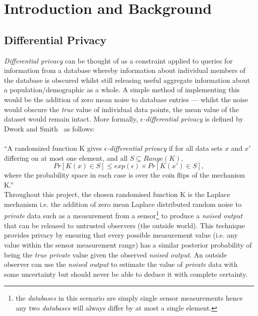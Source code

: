 \documentclass[12pt]{article}
\begin{document}
\newpage


\pagestyle{default}
%
%

\section{Introduction and Background}
  \subsection{Differential Privacy}
    \textit{Differential privacy} can be thought of as a constraint applied to queries for information from a database whereby information about individual members of the database is obscured whilst still releasing useful aggregate information about a population/demographic as a whole. A simple method of implementing this would be the addition of zero mean noise to database entries --- whilst the noise would obscure the \textit{true} value of individual data points, the mean value of the dataset would remain intact. More formally, \textit{$\epsilon$-differential privacy} is defined by Dwork and Smith~\cite{dwork2010differential} as follows:\\
    \\
    ``A randomized function K gives \textit{$\epsilon$-differential privacy} if for all data sets $x$ and $x'$ differing on at most one element, and all $S \subseteq Range(K)$,
    \begin{equation}
      Pr[K(x) \in S] \leq exp(\epsilon) \times Pr[K(x') \in S],
    \end{equation}
    where the probability space in each case is over the coin flips of the mechanism K.''\\

    Throughout this project, the chosen randomised function K is the Laplace mechanism i.e. the addition of zero mean Laplace distributed random noise to \textit{private} data such as a measurement from a sensor\footnote{the \textit{databases} in this scenario are simply single sensor measurements hence any two \textit{databases} will always differ by at most a single element.} to produce a \textit{noised output} that can be released to untrusted observers (the outside world). This technique provides privacy by ensuring that every possible measurement value (i.e. any value within the sensor measurement range) has a similar posterior probability of being the \textit{true private} value given the observed \textit{noised output}. An outside observer can use the \textit{noised output} to estimate the value of \textit{private} data with some uncertainty but should never be able to deduce it with complete certainty.\\
\end{document}
